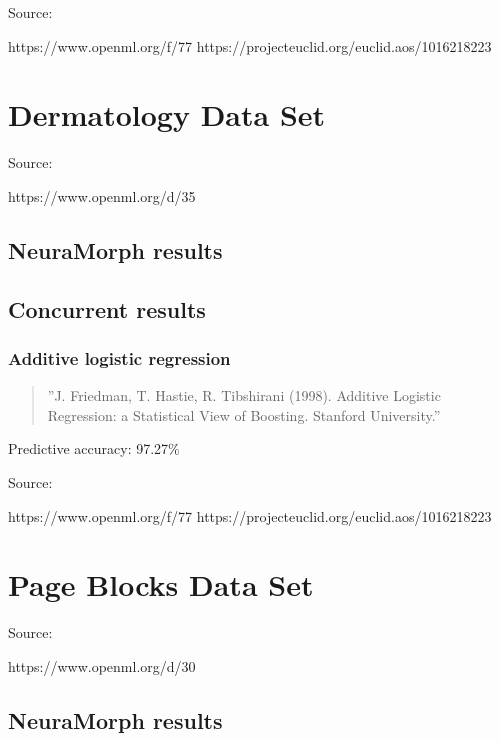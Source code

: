 \documentclass[8pt, a4paper]{article}
\begin{document}
Source:

https://www.openml.org/f/77
https://projecteuclid.org/euclid.aos/1016218223







\newpage
\section{Dermatology Data Set}

Source: 

https://www.openml.org/d/35

\subsection{NeuraMorph results}



\subsection{Concurrent results}

\subsubsection{Additive logistic regression}

\begin{quote}
''J. Friedman, T. Hastie, R. Tibshirani (1998). Additive Logistic Regression: a Statistical View of Boosting. Stanford University.''
\end{quote}

Predictive accuracy: 97.27\%

Source:

https://www.openml.org/f/77
https://projecteuclid.org/euclid.aos/1016218223






\newpage
\section{Page Blocks Data Set}

Source: 

https://www.openml.org/d/30

\subsection{NeuraMorph results}
\end{document}
